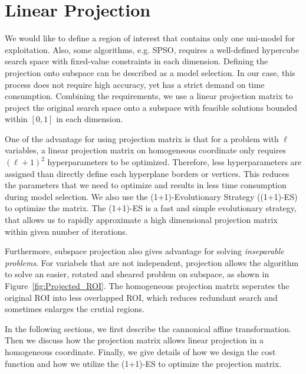 \chapter{Linear Projection}
\label{chapter:projection}

We would like to define a region of interest that contains only one uni-model for exploitation.
Also, some algorithms, e.g. SPSO, requires a well-defined hypercube search space with fixed-value constraints in each dimension.
Defining the projection onto subspace can be described as a model selection.
In our case, this process does not require high accuracy, yet has a strict demand on time consumption.
Combining the requirements, we use a linear projection matrix to project the original search space 
onto a subspace with feasible solutions bounded within $[0,1]$ in each dimension.

One of the advantage for using projection matrix is that for a problem with $\ell$ variables, 
a linear projection matrix on homogeneous coordinate only requires $(\ell+1)^2$ hyperparameters to be optimized.
Therefore, less hyperparameters are assigned than directly define each hyperplane borders or vertices.  
This reduces the parameters that we need to optimize and results in less time consumption during model selection.
We also use the (1+1)-Evolutionary Strategy ((1+1)-ES) to optimize the matrix.
The (1+1)-ES is a fast and simple evolutionary strategy,
that allows us to rapidly approximate a high dimensional projection matrix within given number of iterations.

Furthermore, subspace projection also gives advantage for solving \textit{inseparable problems}.
For variabels that are not independent, projection allows the algorithm
to solve an easier, rotated and sheared problem on subspace, as shown in Figure~\ref{fig:Projected_ROI}.
The homogeneous projection matrix seperates the original ROI into less overlapped ROI, 
which reduces redundant search and sometimes enlarges the crutial regions.

In the following sections, we first describe the cannonical affine transformation.
Then we discuss how the projection matrix allows linear projection in a homogeneous coordinate.
Finally, we give details of how we design the cost function and how we utilize the (1+1)-ES to optimize the projection matrix.

